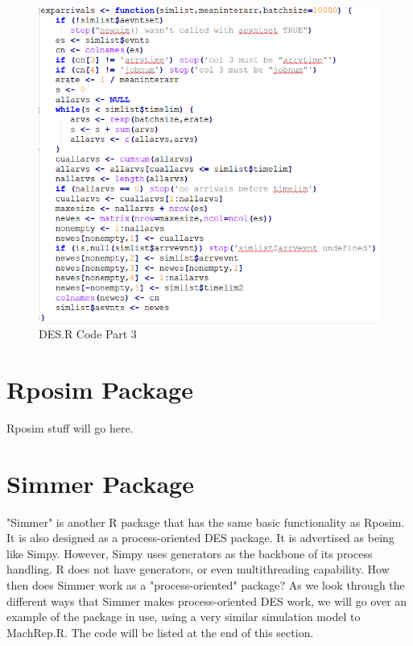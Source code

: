 \documentclass[a4paper, 11pt]{article} %
\begin{document}
\begin{figure}[H]
	\caption{DES.R Code Part 3}
	\includegraphics{des3}
	\centering
\end{figure} \pagebreak


\section*{Rposim Package}

Rposim stuff will go here. \pagebreak


\section*{Simmer Package}

"Simmer" is another R package that has the same basic functionality as Rposim. It is also designed as a process-oriented DES package. It is advertised as being like Simpy. However, Simpy uses generators as the backbone of its process handling. R does not have generators, or even multithreading capability. How then does Simmer work as a "process-oriented" package? As we look through the different ways that Simmer makes process-oriented DES work, we will go over an example of the package in use, using a very similar simulation model to MachRep.R. The code will be listed at the end of this section.
\end{document}
